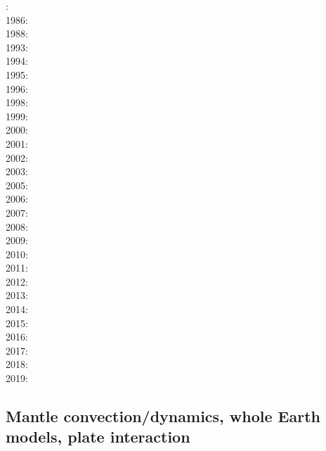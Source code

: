 {\scriptsize
{}: \cite{scst84}\cite{mcke84}\\
1986: \cite{scst86}\\
1988: \cite{scot88}\\
1993: \cite{spie93}\cite{tast93}\\
1994: \cite{jhpp94}\\
1995: \cite{bisc95}\\
1996: \cite{laki96}\\
1998: \cite{rabg98}\\
1999: \cite{devv99}\\
2000: \cite{elha00}\\
2001: \cite{bers01}\\
2002: \cite{sobo02}\\
2003: \cite{beri03}\\
2005: \cite{onml05}\\
2006: \cite{onmm06}\\
2007: \cite{srrb07}\cite{mohb07}\cite{elki07}\cite{copb07}\\
2008: \cite{hets08}\cite{hest08}\\
2009: \cite{bavi09}\\
2010: \cite{baiv10}\cite{habl10}\cite{cows10}\\
2011: \cite{baiv11}\cite{zhgy11}\cite{zhgh11}\cite{bics11}\\
2012: \cite{yatd12}\cite{kasc12b}\cite{ullc12}\\
2013: \cite{kemk13}\cite{mofm13}\cite{mowe13}\\
2014: \cite{kast14}\\
2015: \cite{tukb15}\cite{moba15}\cite{rerl15}\cite{riag15}\\
2016: \cite{keka16}\\
2017: \cite{dilc17}\\
2018: \cite{lorg18}\\
2019: \cite{dagg19}
}

\subsection{Mantle convection/dynamics, whole Earth models, plate interaction}

